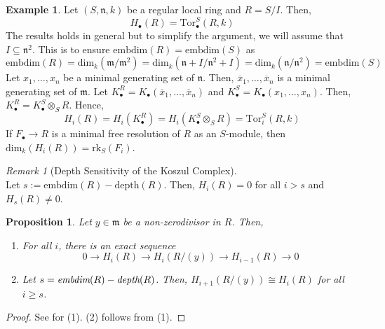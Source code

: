 \documentclass[oneside,11pt,reqno]{amsart}
\newtheorem{prop}[thm]{Proposition}
\theoremstyle{definition}
\newtheorem{ex}[thm]{Example}
\theoremstyle{remark}
\newtheorem{rem}[thm]{Remark}
\begin{document}
\begin{ex}
 Let $(S,\mathfrak{n},k)$ be a regular local ring and $R=S/I$. Then, $$H_{\bullet}(R)= \text{Tor}_{\bullet}^{S}(R,k)$$
 The results holds in general but to simplify the argument, we will assume that $I\subseteq \mathfrak{n}^{2}$. This is to ensure $\text{embdim}(R)=\text{embdim}(S)$ as
 \begin{equation*}
 \text{embdim}(R) =\text{dim}_{k}(\mathfrak{m}/\mathfrak{m}^{2}) = \text{dim}_{k}(\mathfrak{n}+I/\mathfrak{n}^{2}+I)=\text{dim}_{k}(\mathfrak{n}/\mathfrak{n}^{2} )= \text{embdim}(S)          
 \end{equation*}
 Let $x_{1},\ldots ,x_{n}$ be a minimal generating set of $\mathfrak{n} $. Then, $\overline{x}_{1} ,\ldots ,\overline{x}_{n} $ is a minimal generating set of $\mathfrak{m} $. Let $K_{\bullet}^{R}=K_{\bullet}(\overline{x}_{1},\ldots ,\overline{x}_{n}  )$ and $K_{\bullet}^{S}=K_{\bullet}(x_{1},\ldots ,x_{n})$. Then, $K_{\bullet}^{R}=K_{\bullet}^{S} \otimes _{S} R$. Hence,
\begin{equation*}
 H_{i}(R)=H_{i}(K_{\bullet}^{R})=H_{i}(K_{\bullet }^{S} \otimes _{S} R) = \text{Tor}_{i}^{S}(R,k) 
\end{equation*}
If $F_{\bullet} \rightarrow R$ is a minimal free resolution of $R$ as an $S$-module, then $\text{dim}_{k}(H_{i}(R))=\text{rk}_{S}(F_{i})$.


\end{ex}





\begin{rem}[Depth Sensitivity of the Koszul Complex]~\\
 Let $s:=\text{embdim}(R)-\text{depth}(R)$. Then, $H_{i}(R)=0$ for all $i>s$ and $H_{s}(R)\neq 0$.    
\end{rem}

\begin{prop}
 Let $y\in \mathfrak{m} $ be a non-zerodivisor in $R$. Then,
 \begin{enumerate}[label=\emph{(\arabic*)}]
 \item For all $i$, there is an exact sequence
	 \begin{equation*}
	  0 \rightarrow H_{i}(R) \rightarrow H_{i}(R/(y)) \rightarrow H_{i-1}(R) \rightarrow 0
	 \end{equation*}
 \item Let $s=\emph{embdim}(R)-\emph{depth}(R)$. Then, $H_{i+1}(R/(y))\cong H_{i}(R)$ for all $i\geqslant s$.
 \end{enumerate}
\end{prop}
\begin{proof}
	See \cite[Theorem 16.4]{CRT} for (1). (2) follows from (1).
\end{proof}
\end{document}
